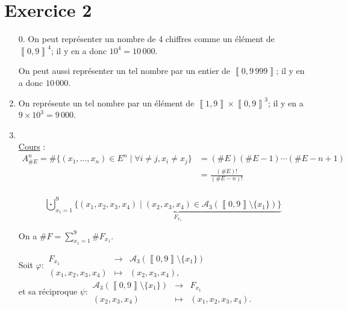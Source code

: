 \part{Exercice 2}

\begin{enumerate}
	\item[0.] On peut représenter un nombre de 4 chiffres comme un élément de $ \left\llbracket 0,9 \right\rrbracket ^4$; il y en a donc $10^4 = 10\,000$.

		On peut aussi représenter un tel nombre par un entier de $ \left\llbracket 0,9\,999 \right\rrbracket$; il y en a donc $10\,000$.

	\item On représente un tel nombre par un élément de $ \left\llbracket 1,9 \right\rrbracket \times \left\llbracket 0,9 \right\rrbracket^3$; il y en a $9 \times 10^3 = 9\,000$.
	\item~\\
		\underline{Cours} : 
		\begin{align*}
			A_{\#E}^n = \#\{(x_1, \ldots, x_n) \in E^n  \mid \forall i \neq j, x_i \neq x_j\}
			&= (\#E)(\#E - 1)\cdots(\#E - n + 1) \\
			&= \frac{(\#E)!}{(\#E - n)!} \\
		\end{align*}

		\[
			\bigcupdot_{x_1 = 1}^9 \underbrace{\big\{(x_1, x_2, x_3, x_4)  \mid (x_2,x_3,x_4) \in \mathcal{A}_3(\left\llbracket 0,9 \right\rrbracket \setminus \{x_1\})\big\}}_{F_{x_1}}
		\]

		On a $\#F = \sum_{x_1=1}^9 \#F_{x_1}$.

		Soit $\varphi : \begin{array}{rcl}
			F_{x_1} &\longrightarrow& \mathcal{A}_{3}(\left\llbracket 0,9 \right\rrbracket \setminus \{x_1\}) \\
			(x_1,x_2,x_3,x_4) &\longmapsto& (x_2,x_3,x_4),
		\end{array}$\\[3mm]
		et sa réciproque $\psi : \begin{array}{rcl}
			\mathcal{A}_3(\left\llbracket 0,9 \right\rrbracket \setminus \{x_1\}) &\longrightarrow& F_{x_1} \\
			(x_2,x_3,x_4) &\longmapsto& (x_1,x_2,x_3,x_4).
		\end{array}$


\end{enumerate}
